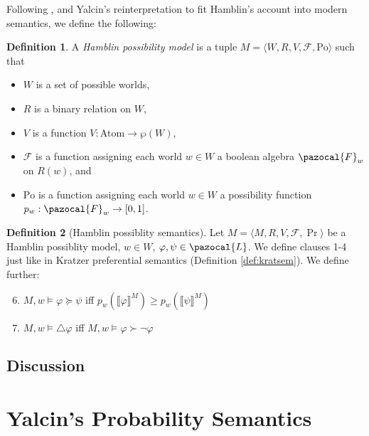 \documentclass{article}
\theoremstyle{definition}
\newtheorem{definition}{Definition}
\renewcommand{\L}{\pazocal{L}}
\renewcommand{\F}{\pazocal{F}}
\newcommand{\lb}{\llbracket}
\newcommand{\rb}{\rrbracket}
\newcommand{\Po}{\text{Po}}
\begin{document}
Following \textcite{hamblin59_modal_probab},
\textcite[][pp.~42]{halpern03_reason_about_uncer} and Yalcin's
\parencite*{yalcin10_probab_operat} reinterpretation to fit Hamblin's account into modern
semantics, we define the following: 
\begin{definition}
    A \emph{Hamblin possibility model} is a tuple $M = \langle W,R,V,\mathcal{F},\Po\rangle$ such that
    \begin{itemize}[nosep]
        \renewcommand\labelitemi{--}
      \item $W$ is a  set of possible worlds,
      \item $R$ is a binary relation on $W$,
        \item $V$ is a function $V: \text{Atom} \rightarrow \wp(W)$,
        \item $\mathcal{F}$ is a function assigning each world $w \in W$ a boolean algebra $\F_w$ on $R(w)$, and 
          \item $\Po$ is a function assigning each world $w \in W$ a possibility function \\ $p_w: \F_w \rightarrow [0,1]$.
    \end{itemize}
\end{definition}

\begin{definition}[Hamblin possiblity semantics]
    \label{def:hambsem}
    Let $M = \langle M,R,V,\mathcal{F},\Pr \rangle$ be a Hamblin possiblity model, $w \in W$, $\varphi, \psi \in \L$. We define clauses 1-4 just like in Kratzer preferential semantics (Definition \ref{def:kratsem}). We define further:
    \begin{enumerate}[nosep]
  \setcounter{enumi}{5}
      \item $M,w \models \varphi \succeq \psi$ iff $p_w(\lb \varphi \rb^M) \geq p_w(\lb \psi \rb^M) $
      \item $M,w \models \triangle \varphi$ iff $M,w \models \varphi \succ \neg \varphi$ 
    \end{enumerate}
\end{definition}
\subsection{Discussion}
\section{Yalcin's Probability Semantics}

\end{document}
